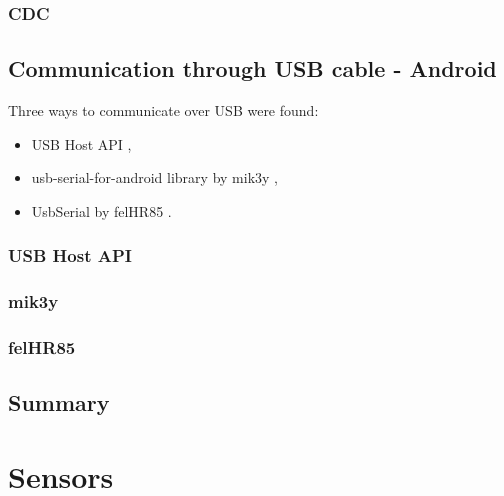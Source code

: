 \documentclass[openany]{mgr} %
\begin{document}
\subsection{CDC}

\section{Communication through USB cable - Android}
Three ways to communicate over USB were found:
\begin{itemize}
  \item USB Host API \cite{android_reference},
  \item usb-serial-for-android library by mik3y \cite{mik3y},
  \item UsbSerial by felHR85 \cite{felHR85}.
\end{itemize}

\subsection{USB Host API}
\subsection{mik3y}
\subsection{felHR85}

\section{Summary}

\chapter{Sensors}
\end{document}
